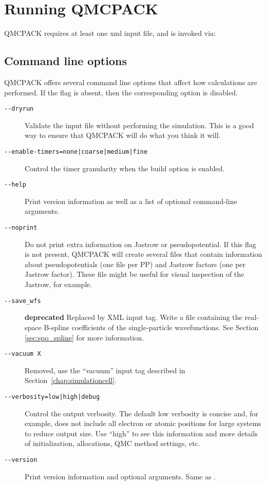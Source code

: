 \chapter{Running QMCPACK}
\label{chap:running}

QMCPACK requires at least one xml input file, and is invoked via:

{}

\section{Command line options}
\label{sec:commandline}
QMCPACK offers several command line options that affect how calculations
are performed. If the flag is absent, then the corresponding
option is disabled.

\begin{description}
\item[\texttt{-{}-dryrun}]{ Validate the input file without performing the simulation.
  This is a good way to ensure that QMCPACK will do what you think it will. }
\item[\texttt{-{}-enable-timers=none|coarse|medium|fine}]{ Control the timer granularity
  when the build option  is enabled. }
\item[\texttt{-{}-help}]{ Print version information as well as a list of optional
  command-line arguments. }
\item[\texttt{-{}-noprint}]{ Do not print extra information on Jastrow or pseudopotential.
  If this flag is not present, QMCPACK will create several  files
  that contain information about pseudopotentials (one file per PP) and Jastrow
  factors (one per Jastrow factor). These file might be useful for visual inspection
  of the Jastrow, for example. }
\item[\texttt{-{}-save\_wfs}]{ \textbf{deprecated} Replaced by  XML input tag.
  Write a  file containing the real-space B-spline
  coefficients of the single-particle wavefunctions. See Section
  \ref{sec:spo_spline} for more information.}
\item[\texttt{-{}-vacuum X}]{Removed, use the ``vacuum'' input tag described in Section~\ref{chap:simulationcell}. }
\item[\texttt{-{}-verbosity=low|high|debug}]{ Control the output verbosity. The default low verbosity is concise and, for example, does not include all electron or atomic positions for large systems to reduce output size. Use ``high'' to see this information and more details of initialization, allocations, QMC method settings, etc. }
\item[\texttt{-{}-version}]{ Print version information and optional arguments.
  Same as . }
\end{description}


